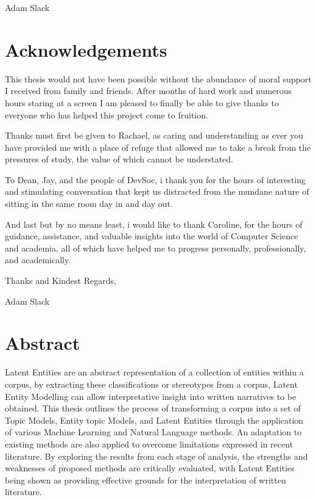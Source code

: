 \documentclass[10pt]{report}
\begin{document}
Adam Slack

\newpage
{}
\section*{Acknowledgements}
\renewcommand{\baselinestretch}{1.5}\normalsize

This thesis would not have been possible without the abundance of moral support I received from family and friends. After months of hard work and numerous hours staring at a screen I am pleased to finally be able to give thanks to everyone who has helped this project come to fruition.

Thanks must first be given to Rachael, as caring and understanding as ever you have provided me with a place of refuge that allowed me to take a break from the pressures of study, the value of which cannot be understated.

To Dean, Jay, and the people of DevSoc, i thank you for the hours of interesting and stimulating conversation that kept us distracted from the mundane nature of sitting in the same room day in and day out.

And last but by no means least, i would like to thank Caroline, for the hours of guidance, assistance, and valuable insights into the world of Computer Science and academia, all of which have helped me to progress personally, professionally, and academically.

\renewcommand{\baselinestretch}{2.0}\normalsize

Thanks and Kindest Regards,

Adam Slack

\renewcommand{\baselinestretch}{1.0}\normalsize

\newpage
{}
\section*{Abstract}

\renewcommand{\baselinestretch}{1.5}\normalsize

Latent Entities are an abstract representation of a collection of entities within a corpus, by extracting these classifications or stereotypes from a corpus, Latent Entity Modelling can allow interpretative insight into written narratives to be obtained. This thesis outlines the process of transforming a corpus into a set of Topic Models, Entity topic Models, and Latent Entities through the application of various Machine Learning and Natural Language methods. An adaptation to existing methods are also applied to overcome limitations expressed in recent literature. By exploring the results from each stage of analysis, the strengths and weaknesses of proposed methods are critically evaluated, with Latent Entities being shown as providing effective grounds for the interpretation of written literature.
\end{document}
